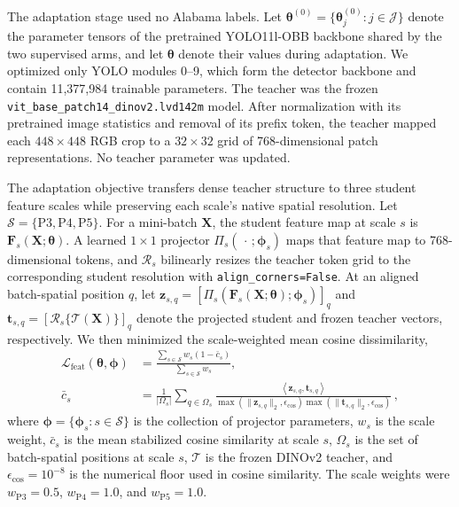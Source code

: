 \documentclass[preprint,12pt,authoryear]{elsarticle}
\begin{document}
The adaptation stage used no Alabama labels. Let $\bm{\theta}^{(0)}=\{\bm{\theta}^{(0)}_j:j\in\mathcal{J}\}$ denote the parameter tensors of the pretrained YOLO11l-OBB backbone shared by the two supervised arms, and let $\bm{\theta}$ denote their values during adaptation. We optimized only YOLO modules 0--9, which form the detector backbone and contain 11,377,984 trainable parameters. The teacher was the frozen \texttt{vit\_base\_patch14\_dinov2.lvd142m} model. After normalization with its pretrained image statistics and removal of its prefix token, the teacher mapped each $448\times448$ RGB crop to a $32\times32$ grid of 768-dimensional patch representations. No teacher parameter was updated.

The adaptation objective transfers dense teacher structure to three student feature scales while preserving each scale's native spatial resolution. Let $\mathcal{S}=\{\mathrm{P3},\mathrm{P4},\mathrm{P5}\}$. For a mini-batch $\mathbf{X}$, the student feature map at scale $s$ is $\mathbf{F}_s(\mathbf{X};\bm{\theta})$. A learned $1\times1$ projector $\Pi_s(\,\cdot\,;\bm{\phi}_s)$ maps that feature map to 768-dimensional tokens, and $\mathcal{R}_s$ bilinearly resizes the teacher token grid to the corresponding student resolution with \texttt{align\_corners=False}. At an aligned batch-spatial position $q$, let $\mathbf{z}_{s,q}=[\Pi_s(\mathbf{F}_s(\mathbf{X};\bm{\theta});\bm{\phi}_s)]_q$ and $\mathbf{t}_{s,q}=[\mathcal{R}_s\{\mathcal{T}(\mathbf{X})\}]_q$ denote the projected student and frozen teacher vectors, respectively. We then minimized the scale-weighted mean cosine dissimilarity,
\begin{equation}
\begin{aligned}
\mathcal{L}_{\mathrm{feat}}(\bm{\theta},\bm{\phi})
&=\frac{\sum_{s\in\mathcal{S}}w_s\left(1-\bar{c}_s\right)}
{\sum_{s\in\mathcal{S}}w_s},\\
\bar{c}_s
&=\frac{1}{|\Omega_s|}\sum_{q\in\Omega_s}
\frac{\left\langle\mathbf{z}_{s,q},\mathbf{t}_{s,q}\right\rangle}
{\max\!\left(\lVert\mathbf{z}_{s,q}\rVert_2,\epsilon_{\mathrm{cos}}\right)
 \max\!\left(\lVert\mathbf{t}_{s,q}\rVert_2,\epsilon_{\mathrm{cos}}\right)}\,,
\end{aligned}
\label{eq:feature}
\end{equation}
where $\bm{\phi}=\{\bm{\phi}_s:s\in\mathcal{S}\}$ is the collection of projector parameters, $w_s$ is the scale weight, $\bar{c}_s$ is the mean stabilized cosine similarity at scale $s$, $\Omega_s$ is the set of batch-spatial positions at scale $s$, $\mathcal{T}$ is the frozen DINOv2 teacher, and $\epsilon_{\mathrm{cos}}=10^{-8}$ is the numerical floor used in cosine similarity. The scale weights were $w_{\mathrm{P3}}=0.5$, $w_{\mathrm{P4}}=1.0$, and $w_{\mathrm{P5}}=1.0$.
\end{document}
